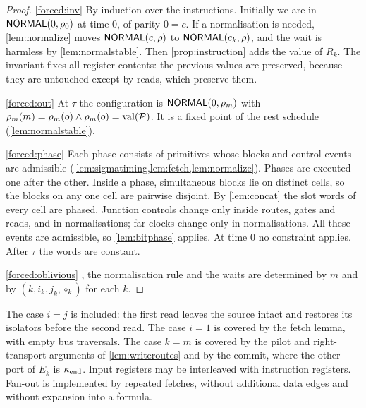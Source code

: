 \begin{proof}
\ref{forced:inv} By induction over the instructions. Initially we are in $\textsf{NORMAL}(0,\rho_0)$ at time
$0$, of parity $0=c$. If a normalisation is needed, \cref{lem:normalize} moves $\textsf{NORMAL}(c,\rho)$ to
$\textsf{NORMAL}(c_k,\rho)$, and the wait is harmless by \cref{lem:normalstable}. Then
\cref{prop:instruction} adds the value of $R_k$. The invariant fixes all register contents: the
previous values are preserved, because they are untouched except by reads, which preserve them.

\ref{forced:out} At $\tau$ the configuration is $\textsf{NORMAL}(0,\rho_m)$ with
$\rho_m(m)=\rho_m(o)\wedge\rho_m(o)=\operatorname{val}(\mathcal P)$. It is a fixed point of the rest schedule
(\cref{lem:normalstable}).

\ref{forced:phase} Each phase consists of primitives whose blocks and control events are admissible
(\cref{lem:sigmatiming,lem:fetch,lem:normalize}). Phases are executed one after the other. Inside a
phase, simultaneous blocks lie on distinct cells, so the blocks on any one cell are pairwise
disjoint. By \cref{lem:concat} the slot words of every cell are phased. Junction controls change only
inside routes, gates and reads, and in normalisations; far clocks change only in normalisations. All
these events are admissible, so \cref{lem:bitphase} applies. At time $0$ no constraint applies.
After $\tau$ the words are constant.

\ref{forced:oblivious} , the normalisation rule and the waits are determined by
$m$ and by $(k,i_k,j_k,\circ_k)$ for each $k$.
\end{proof}

\begin{remark}\label{rem:boundary}
The case $i=j$ is included: the first read leaves the source intact and restores its isolators
before the second read. The case $i=1$ is covered by the fetch lemma, with empty bus traversals. The
case $k=m$ is covered by the pilot and right-transport arguments of \cref{lem:writeroutes} and by
the commit, where the other port of $E_k$ is $\kappa_{\mathrm{end}}$. Input registers may be interleaved with
instruction registers. Fan-out is implemented by repeated fetches, without additional data edges and
without expansion into a formula.
\end{remark}

